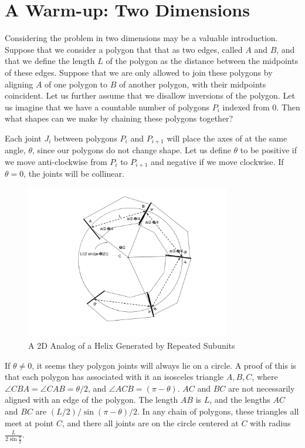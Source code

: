 \documentclass[11pt]{article}
\begin{document}
{\section{A Warm-up: Two Dimensions}

Considering the problem in two dimensions may be a valuable introduction.
Suppose that we consider a polygon that that as two edges, called $A$ and $B$, and that we define the length $L$ of the
polygon as the distance between the midpoints of these edges. Suppose that we are only allowed to join these
polygons by aligning $A$ of one polygon to $B$ of another polygon, with their midpoints coincident. Let us
further assume that we disallow inversions of the polygon.  Let us imagine that we have a
countable number of polygons $P_i$ indexed from $0$. Then what shapes can we make by chaining these
polygons together?

Each joint $J_i$ between polygons $P_i$ and $P_{i+1}$ will place the axes of at the same angle, $\theta$, since
our polygons do not change shape. Let us define $\theta$ to be positive
if we move anti-clockwise from $P_i$ to $P_{i+1}$ and negative if we move clockwise. 
If $\theta = 0$, the joints will be collinear.

\begin{figure}
     \centering
     \includegraphics[width=0.80\textwidth]{figures/2DPolygonStacking.png}
     \caption{A 2D Analog of a Helix Generated by Repeated Subunits}
  \label{fig:prismdiagram}
\end{figure}

If $\theta \neq 0$, it seems they polygon joints will always lie on a circle. A proof of this
is that each polygon has associated with it an isosceles triangle $A,B,C$, where $\angle CBA = \angle CAB = \theta/2$,
and $\angle ACB = (\pi - \theta)$. $AC$ and $BC$ are not necessarily aligned with an edge of the polygon.
The length $AB$ is $L$, and the lengths $AC$ and $BC$ are
$(L/2) / \sin{(\pi - \theta)/2}$. In any chain of polygons, these triangles all meet at point $C$, and there all
joints are on the circle centered at $C$ with radius $\frac{L}{2 \sin{\frac{\theta}{2}}}$.

}
\end{document}
